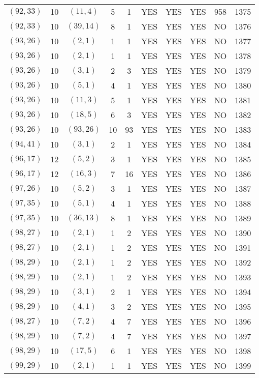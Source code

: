 \begin{longtable}{|c|c|c|c|c|c|c|c|c|c|}
$(92, 33)$ & 10 & $(11, 4)$ & 5 & 1 & YES & YES & YES & 958 & 1375\\
$(92, 33)$ & 10 & $(39, 14)$ & 8 & 1 & YES & YES & YES & NO & 1376\\
$(93, 26)$ & 10 & $(2, 1)$ & 1 & 1 & YES & YES & YES & NO & 1377\\
$(93, 26)$ & 10 & $(2, 1)$ & 1 & 1 & YES & YES & YES & NO & 1378\\
$(93, 26)$ & 10 & $(3, 1)$ & 2 & 3 & YES & YES & YES & NO & 1379\\
$(93, 26)$ & 10 & $(5, 1)$ & 4 & 1 & YES & YES & YES & NO & 1380\\
$(93, 26)$ & 10 & $(11, 3)$ & 5 & 1 & YES & YES & YES & NO & 1381\\
$(93, 26)$ & 10 & $(18, 5)$ & 6 & 3 & YES & YES & YES & NO & 1382\\
$(93, 26)$ & 10 & $(93, 26)$ & 10 & 93 & YES & YES & YES & NO & 1383\\
$(94, 41)$ & 10 & $(3, 1)$ & 2 & 1 & YES & YES & YES & NO & 1384\\
$(96, 17)$ & 12 & $(5, 2)$ & 3 & 1 & YES & YES & YES & NO & 1385\\
$(96, 17)$ & 12 & $(16, 3)$ & 7 & 16 & YES & YES & YES & NO & 1386\\
$(97, 26)$ & 10 & $(5, 2)$ & 3 & 1 & YES & YES & YES & NO & 1387\\
$(97, 35)$ & 10 & $(5, 1)$ & 4 & 1 & YES & YES & YES & NO & 1388\\
$(97, 35)$ & 10 & $(36, 13)$ & 8 & 1 & YES & YES & YES & NO & 1389\\
$(98, 27)$ & 10 & $(2, 1)$ & 1 & 2 & YES & YES & YES & NO & 1390\\
$(98, 27)$ & 10 & $(2, 1)$ & 1 & 2 & YES & YES & YES & NO & 1391\\
$(98, 29)$ & 10 & $(2, 1)$ & 1 & 2 & YES & YES & YES & NO & 1392\\
$(98, 29)$ & 10 & $(2, 1)$ & 1 & 2 & YES & YES & YES & NO & 1393\\
$(98, 29)$ & 10 & $(3, 1)$ & 2 & 1 & YES & YES & YES & NO & 1394\\
$(98, 29)$ & 10 & $(4, 1)$ & 3 & 2 & YES & YES & YES & NO & 1395\\
$(98, 27)$ & 10 & $(7, 2)$ & 4 & 7 & YES & YES & YES & NO & 1396\\
$(98, 29)$ & 10 & $(7, 2)$ & 4 & 7 & YES & YES & YES & NO & 1397\\
$(98, 29)$ & 10 & $(17, 5)$ & 6 & 1 & YES & YES & YES & NO & 1398\\
$(99, 29)$ & 10 & $(2, 1)$ & 1 & 1 & YES & YES & YES & NO & 1399\\

\end{longtable}
